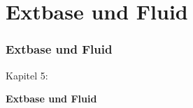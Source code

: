 %

\section{Extbase und Fluid}
\begin{frame}[fragile]
	\frametitle{Extbase und Fluid}

	\begin{center}\huge{Kapitel 5:}\end{center}
	\begin{center}\huge{\color{typo3darkgrey}\textbf{Extbase und Fluid}}\end{center}

\end{frame}

